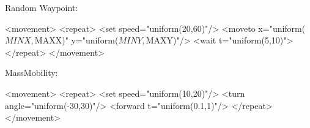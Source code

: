 Random Waypoint:

\begin{XML}
<movement>
    <repeat>
        <set speed="uniform(20,60)"/>
        <moveto x="uniform($MINX,$MAXX)" y="uniform($MINY,$MAXY)"/>
        <wait t="uniform(5,10)">
    </repeat>
</movement>
\end{XML}

MassMobility:

\begin{XML}
<movement>
    <repeat>
        <set speed="uniform(10,20)"/>
        <turn angle="uniform(-30,30)"/>
        <forward t="uniform(0.1,1)"/>
    </repeat>
</movement>
\end{XML}





